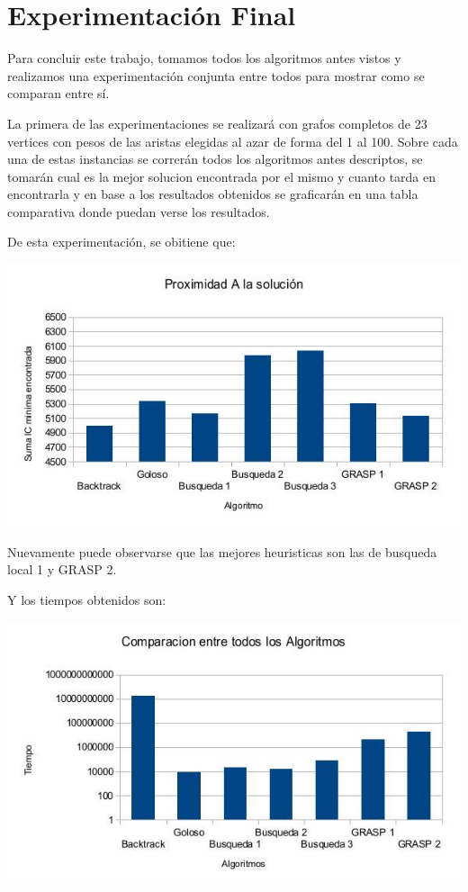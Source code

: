 \section{Experimentación Final}

Para concluir este trabajo, tomamos todos los algoritmos antes vistos y realizamos una experimentación conjunta entre todos para mostrar como se comparan entre sí.

La primera de las experimentaciones se realizará con grafos completos de 23 vertices con pesos de las aristas elegidas al azar de forma  del 1 al 100. Sobre cada una de estas instancias se correrán todos los algoritmos antes descriptos, se tomarán cual es la mejor solucion encontrada por el mismo y cuanto tarda en encontrarla y en base a los resultados obtenidos se graficarán en una tabla comparativa donde puedan verse los resultados.

De esta experimentación, se obitiene que:

\includegraphics[scale=0.5]{Con/result.jpg}

Nuevamente puede observarse que las mejores heuristicas son las de busqueda local 1 y GRASP 2.

Y los tiempos obtenidos son:

\includegraphics[scale=0.5]{Con/tiempos.jpg}

